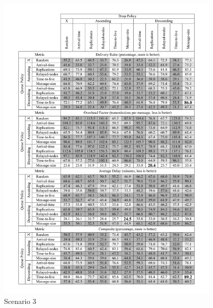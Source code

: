 \documentclass[conference,10pt,letterpaper,final]{IEEEtran}
\begin{document}
\begin{figure}[h]
	\centering
	\includegraphics[width=0.95\textwidth]{graphics/tables/scenario3}
	\caption{Scenario 3}
	\label{results:scenario3}
\end{figure}
\end{document}
